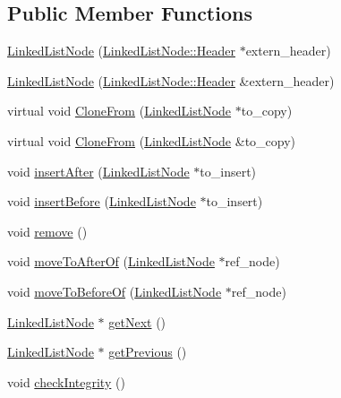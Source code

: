 \subsection*{Public Member Functions}
\begin{DoxyCompactItemize}
\item 
\hyperlink{classDataJuggler_1_1LinkedListNode_af152a8cc8a324734b8aaaf59736ccec1}{Linked\+List\+Node} (\hyperlink{classDataJuggler_1_1LinkedListNode_1_1Header}{Linked\+List\+Node\+::\+Header} $\ast$extern\+\_\+header)
\item 
\hyperlink{classDataJuggler_1_1LinkedListNode_a5791a156ded0c87075b8add6d18c0d51}{Linked\+List\+Node} (\hyperlink{classDataJuggler_1_1LinkedListNode_1_1Header}{Linked\+List\+Node\+::\+Header} \&extern\+\_\+header)
\item 
virtual void \hyperlink{classDataJuggler_1_1LinkedListNode_ae3a9bfcf7f4b13dd0d1f3095626aa108}{Clone\+From} (\hyperlink{classDataJuggler_1_1LinkedListNode}{Linked\+List\+Node} $\ast$to\+\_\+copy)
\item 
virtual void \hyperlink{classDataJuggler_1_1LinkedListNode_ad508fe0c993b16caf5a627e1f265754b}{Clone\+From} (\hyperlink{classDataJuggler_1_1LinkedListNode}{Linked\+List\+Node} \&to\+\_\+copy)
\item 
void \hyperlink{classDataJuggler_1_1LinkedListNode_a509b4493bb13fc771481da50f7593bd9}{insert\+After} (\hyperlink{classDataJuggler_1_1LinkedListNode}{Linked\+List\+Node} $\ast$to\+\_\+insert)
\item 
void \hyperlink{classDataJuggler_1_1LinkedListNode_a50f738d5f3c69e78f417ab5172924a8c}{insert\+Before} (\hyperlink{classDataJuggler_1_1LinkedListNode}{Linked\+List\+Node} $\ast$to\+\_\+insert)
\item 
void \hyperlink{classDataJuggler_1_1LinkedListNode_a007fd147dbf3ca2d83a7c40d5181c26c}{remove} ()
\item 
void \hyperlink{classDataJuggler_1_1LinkedListNode_ad4166bef988c213884d2dc5962519bbb}{move\+To\+After\+Of} (\hyperlink{classDataJuggler_1_1LinkedListNode}{Linked\+List\+Node} $\ast$ref\+\_\+node)
\item 
void \hyperlink{classDataJuggler_1_1LinkedListNode_a88c44bb0d302955fa4be2b1d5e1c743b}{move\+To\+Before\+Of} (\hyperlink{classDataJuggler_1_1LinkedListNode}{Linked\+List\+Node} $\ast$ref\+\_\+node)
\item 
\hyperlink{classDataJuggler_1_1LinkedListNode}{Linked\+List\+Node} $\ast$ \hyperlink{classDataJuggler_1_1LinkedListNode_a65f28eec41e48b46fe28579ef029da16}{get\+Next} ()
\item 
\hyperlink{classDataJuggler_1_1LinkedListNode}{Linked\+List\+Node} $\ast$ \hyperlink{classDataJuggler_1_1LinkedListNode_a12df61829bc55f904a6c7e3c71ab0cdd}{get\+Previous} ()
\item 
void \hyperlink{classDataJuggler_1_1LinkedListNode_ac178b6c57266b64be44d3b7aff54e6b8}{check\+Integrity} ()
\end{DoxyCompactItemize}
